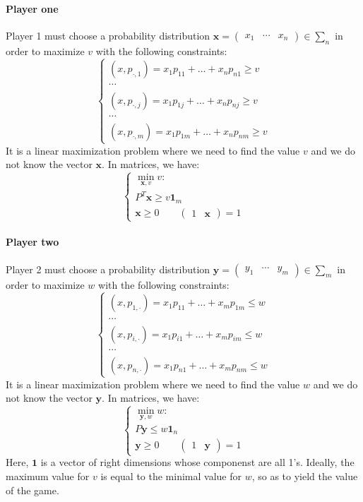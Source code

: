 \paragraph*{Player one}
Player 1 must choose a probability distribution $\mathbf{x}=\begin{pmatrix} x_1 & \cdots & x_n \end{pmatrix} \in \sum_n$ in order to maximize $v$ with the following constraints: 
\[\begin{cases}
    (x,p_{\cdot,1})=x_1p_{11}+\dots+x_np_{n1}\geq v \\
    \cdots \\
    (x,p_{\cdot,j})=x_1p_{1j}+\dots+x_np_{nj}\geq v \\
    \cdots \\
    (x,p_{\cdot,m})=x_1p_{1m}+\dots+x_np_{nm}\geq v
\end{cases}\]
It is a linear maximization problem where we need to find the value $v$ and we do not know the vector $\mathbf{x}$.
In matrices, we have: 
\[\begin{cases}
    \min_{\mathbf{x},v}v: \\
    P^T\mathbf{x} \geq v\mathbf{1}_{m} \\
    \mathbf{x}\geq 0 \qquad \begin{pmatrix} 1 & \mathbf{x} \end{pmatrix} = 1
\end{cases}\]

\paragraph*{Player two}
Player 2 must choose a probability distribution $\mathbf{y}=\begin{pmatrix} y_1 & \cdots & y_m \end{pmatrix} \in \sum_m$ in order to maximize $w$ with the following constraints: 
\[\begin{cases}
    (x,p_{1,\cdot})=x_1p_{11}+\dots+x_mp_{1m}\leq w \\
    \cdots \\
    (x,p_{i,\cdot})=x_1p_{i1}+\dots+x_mp_{im}\leq w \\
    \cdots \\
    (x,p_{n,\cdot})=x_1p_{n1}+\dots+x_mp_{nm}\leq w 
\end{cases}\]
It is a linear maximization problem where we need to find the value $w$ and we do not know the vector $\mathbf{y}$.
In matrices, we have: 
\[\begin{cases}
    \min_{\mathbf{y},w}w: \\
    P\mathbf{y} \leq w\mathbf{1}_{n} \\
    \mathbf{y}\geq 0 \qquad \begin{pmatrix} 1 & \mathbf{y} \end{pmatrix} = 1
\end{cases}\]
Here, $\mathbf{1}$ is a vector of right dimensions whose componenst are all 1's.
Ideally, the maximum value for $v$ is equal to the minimal value for $w$, so as to yield the value of the game.